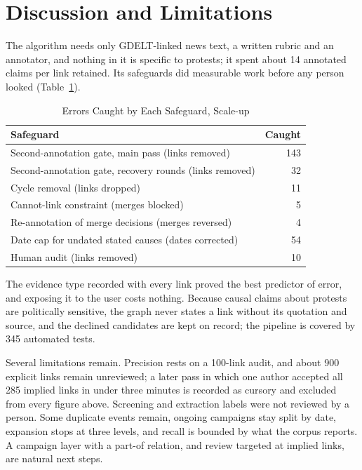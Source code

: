 \documentclass[conference]{IEEEtran}
\begin{document}
\section{Discussion and Limitations}
The algorithm needs only GDELT-linked news text, a written rubric and an annotator, and nothing in
it is specific to protests; it spent about 14 annotated claims per link retained. Its safeguards
did measurable work before any person looked (Table~\ref{tab:guards}).

\begin{table}[t]
\caption{Errors Caught by Each Safeguard, Scale-up}
\label{tab:guards}
\centering
\footnotesize
\begin{tabular}{@{}p{}r@{}}
\toprule
Safeguard & Caught \\
\midrule
Second-annotation gate, main pass (links removed) & 143 \\
Second-annotation gate, recovery rounds (links removed) & 32 \\
Cycle removal (links dropped) & 11 \\
Cannot-link constraint (merges blocked) & 5 \\
Re-annotation of merge decisions (merges reversed) & 4 \\
Date cap for undated stated causes (dates corrected) & 54 \\
Human audit (links removed) & 10 \\
\bottomrule
\end{tabular}
\end{table} The
evidence type recorded with every link proved the best predictor of error, and exposing it to the
user costs nothing. Because causal claims about protests are politically sensitive, the graph never
states a link without its quotation and source, and the declined candidates are kept on record; the
pipeline is covered by 345 automated tests.

Several limitations remain. Precision rests on a 100-link audit, and about 900 explicit links remain
unreviewed; a later pass in which one author accepted all 285 implied links in under three minutes
is recorded as cursory and excluded from every figure above. Screening and extraction labels were
not reviewed by a person. Some duplicate events remain, ongoing campaigns stay split by date,
expansion stops at three levels, and recall is bounded by what the corpus reports. A campaign layer
with a part-of relation, and review targeted at implied links, are natural next steps.
\end{document}
